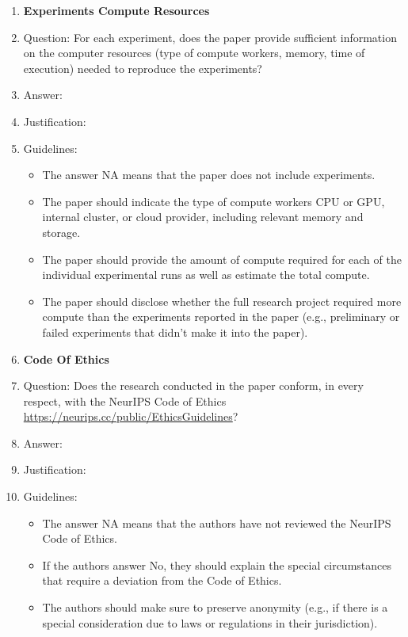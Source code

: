 \documentclass{article} %
\newcounter{ct}
\theoremstyle{definition}
\theoremstyle{remark}
\begin{document}
\begin{enumerate}
\item {\bf Experiments Compute Resources}
    \item[] Question: For each experiment, does the paper provide sufficient information on the computer resources (type of compute workers, memory, time of execution) needed to reproduce the experiments?
    \item[] Answer: \answerTODO{} %
    \item[] Justification: \justificationTODO{}
    \item[] Guidelines:
    \begin{itemize}
        \item The answer NA means that the paper does not include experiments.
        \item The paper should indicate the type of compute workers CPU or GPU, internal cluster, or cloud provider, including relevant memory and storage.
        \item The paper should provide the amount of compute required for each of the individual experimental runs as well as estimate the total compute. 
        \item The paper should disclose whether the full research project required more compute than the experiments reported in the paper (e.g., preliminary or failed experiments that didn't make it into the paper). 
    \end{itemize}
    
\item {\bf Code Of Ethics}
    \item[] Question: Does the research conducted in the paper conform, in every respect, with the NeurIPS Code of Ethics \url{https://neurips.cc/public/EthicsGuidelines}?
    \item[] Answer: \answerTODO{} %
    \item[] Justification: \justificationTODO{}
    \item[] Guidelines:
    \begin{itemize}
        \item The answer NA means that the authors have not reviewed the NeurIPS Code of Ethics.
        \item If the authors answer No, they should explain the special circumstances that require a deviation from the Code of Ethics.
        \item The authors should make sure to preserve anonymity (e.g., if there is a special consideration due to laws or regulations in their jurisdiction).
    \end{itemize}



\end{enumerate}
\end{document}
